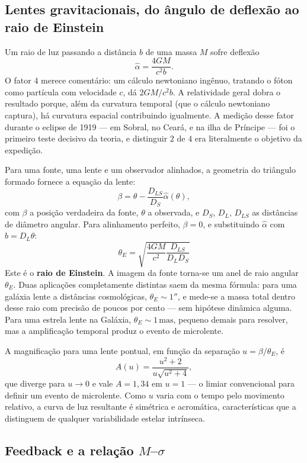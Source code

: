 \documentclass[11pt,a4paper]{article}
\begin{document}
\subsection*{Lentes gravitacionais, do ângulo de deflexão ao raio de Einstein}

Um raio de luz passando a distância $b$ de uma massa $M$ sofre deflexão
\[
\hat{\alpha}=\frac{4GM}{c^{2}b}.
\]
O fator 4 merece comentário: um cálculo newtoniano ingênuo, tratando o fóton como partícula com velocidade $c$, dá $2GM/c^{2}b$. A relatividade geral dobra o resultado porque, além da curvatura temporal (que o cálculo newtoniano captura), há curvatura espacial contribuindo igualmente. A medição desse fator durante o eclipse de 1919 --- em Sobral, no Ceará, e na ilha de Príncipe --- foi o primeiro teste decisivo da teoria, e distinguir $2$ de $4$ era literalmente o objetivo da expedição.

Para uma fonte, uma lente e um observador alinhados, a geometria do triângulo formado fornece a equação da lente:
\[
\beta=\theta-\frac{D_{LS}}{D_S}\hat{\alpha}(\theta),
\]
com $\beta$ a posição verdadeira da fonte, $\theta$ a observada, e $D_S$, $D_L$, $D_{LS}$ as distâncias de diâmetro angular. Para alinhamento perfeito, $\beta=0$, e substituindo $\hat{\alpha}$ com $b=D_L\theta$:
\[
\boxed{\ \theta_E=\sqrt{\frac{4GM}{c^{2}}\frac{D_{LS}}{D_LD_S}}\ }
\]
Este é o \textbf{raio de Einstein}. A imagem da fonte torna-se um anel de raio angular $\theta_E$. Duas aplicações completamente distintas saem da mesma fórmula: para uma galáxia lente a distâncias cosmológicas, $\theta_E\sim1''$, e mede-se a massa total dentro desse raio com precisão de poucos por cento --- sem hipótese dinâmica alguma. Para uma estrela lente na Galáxia, $\theta_E\sim1\,\mathrm{mas}$, pequeno demais para resolver, mas a amplificação temporal produz o evento de microlente.

A magnificação para uma lente pontual, em função da separação $u=\beta/\theta_E$, é
\[
A(u)=\frac{u^{2}+2}{u\sqrt{u^{2}+4}},
\]
que diverge para $u\to0$ e vale $A=1{,}34$ em $u=1$ --- o limiar convencional para definir um evento de microlente. Como $u$ varia com o tempo pelo movimento relativo, a curva de luz resultante é simétrica e acromática, características que a distinguem de qualquer variabilidade estelar intrínseca.

\subsection*{Feedback e a relação $M$--$\sigma$}
\end{document}
